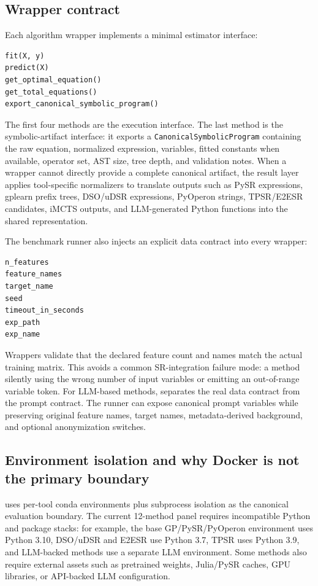 \subsection{Wrapper contract}

Each algorithm wrapper implements a minimal estimator interface:
\begin{verbatim}
fit(X, y)
predict(X)
get_optimal_equation()
get_total_equations()
export_canonical_symbolic_program()
\end{verbatim}
The first four methods are the execution interface. The last method is the symbolic-artifact interface: it exports a \texttt{CanonicalSymbolicProgram} containing the raw equation, normalized expression, variables, fitted constants when available, operator set, AST size, tree depth, and validation notes. When a wrapper cannot directly provide a complete canonical artifact, the result layer applies tool-specific normalizers to translate outputs such as PySR expressions, gplearn prefix trees, DSO/uDSR expressions, PyOperon strings, TPSR/E2ESR candidates, iMCTS outputs, and LLM-generated Python functions into the shared representation.

The benchmark runner also injects an explicit data contract into every wrapper:
\begin{verbatim}
n_features
feature_names
target_name
seed
timeout_in_seconds
exp_path
exp_name
\end{verbatim}
Wrappers validate that the declared feature count and names match the actual training matrix. This avoids a common SR-integration failure mode: a method silently using the wrong number of input variables or emitting an out-of-range variable token. For LLM-based methods, \arena{} separates the real data contract from the prompt contract. The runner can expose canonical prompt variables while preserving original feature names, target names, metadata-derived background, and optional anonymization switches.

\subsection{Environment isolation and why Docker is not the primary boundary}

\arena{} uses per-tool conda environments plus subprocess isolation as the canonical evaluation boundary. The current 12-method panel requires incompatible Python and package stacks: for example, the base GP/PySR/PyOperon environment uses Python 3.10, DSO/uDSR and E2ESR use Python 3.7, TPSR uses Python 3.9, and LLM-backed methods use a separate LLM environment. Some methods also require external assets such as pretrained weights, Julia/PySR caches, GPU libraries, or API-backed LLM configuration.

